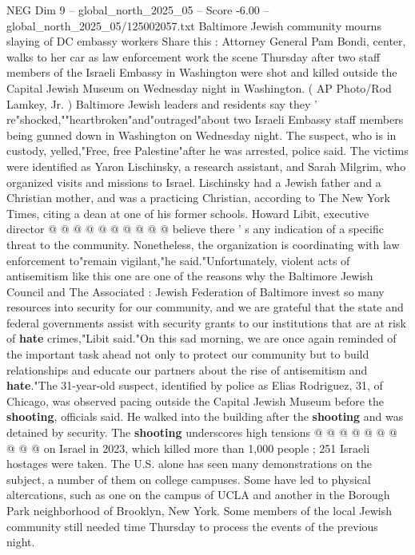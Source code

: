\begin{textsample}{NEG Dim 9 – global\_north\_2025\_05 – Score -6.00 – global\_north\_2025\_05/125002057.txt}  \label{ex:f9_neg_179}
Baltimore Jewish community mourns slaying of DC embassy workers Share this : Attorney General Pam Bondi, center, walks to her car as law enforcement work the scene Thursday after two staff members of the Israeli Embassy in Washington were shot and killed outside the Capital Jewish Museum on Wednesday night in Washington. ( AP Photo/Rod Lamkey, Jr. ) Baltimore Jewish leaders and residents say they ' re"shocked,""heartbroken"and"outraged"about two Israeli Embassy staff members being gunned down in Washington on Wednesday night.
The suspect, who is in custody, yelled,"Free, free Palestine"after he was arrested, police said.
The victims were identified as Yaron Lischinsky, a research assistant, and Sarah Milgrim, who organized visits and missions to Israel.
Lischinsky had a Jewish father and a Christian mother, and was a practicing Christian, according to The New York Times, citing a dean at one of his former schools.
Howard Libit, executive director @ @ @ @ @ @ @ @ @ @ believe there ' s any indication of a specific threat to the community.
Nonetheless, the organization is coordinating with law enforcement to"remain vigilant,"he said."Unfortunately, violent acts of antisemitism like this one are one of the reasons why the Baltimore Jewish Council and The Associated : Jewish Federation of Baltimore invest so many resources into security for our community, and we are grateful that the state and federal governments assist with security grants to our institutions that are at risk of \textbf{hate} crimes,"Libit said."On this sad morning, we are once again reminded of the important task ahead not only to protect our community but to build relationships and educate our partners about the rise of antisemitism and \textbf{hate}."The 31-year-old suspect, identified by police as Elias Rodriguez, 31, of Chicago, was observed pacing outside the Capital Jewish Museum before the \textbf{shooting}, officials said.
He walked into the building after the \textbf{shooting} and was detained by security.
The \textbf{shooting} underscores high tensions @ @ @ @ @ @ @ @ @ @ on Israel in 2023, which killed more than 1,000 people ; 251 Israeli hostages were taken.
The U.S. alone has seen many demonstrations on the subject, a number of them on college campuses.
Some have led to physical altercations, such as one on the campus of UCLA and another in the Borough Park neighborhood of Brooklyn, New York.
Some members of the local Jewish community still needed time Thursday to process the events of the previous night.

\end{textsample}

